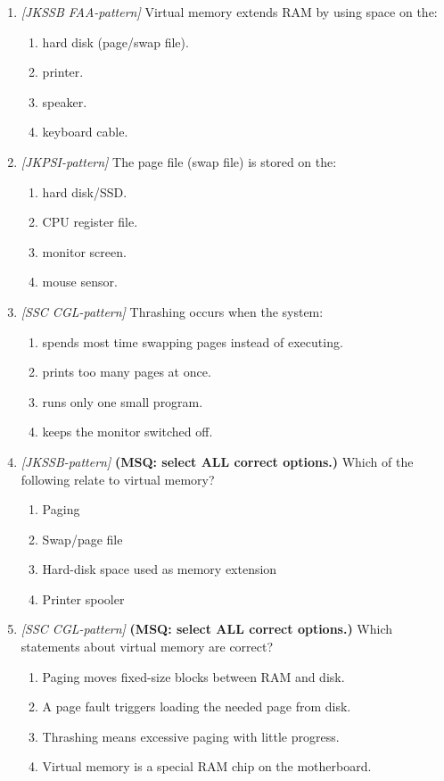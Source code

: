 \documentclass[11pt]{article}
\begin{document}
\begin{enumerate}[label=\textbf{Q\arabic*.}, leftmargin=*]
\item \textit{[JKSSB FAA-pattern]} Virtual memory extends RAM by using space on the:
  \begin{enumerate}[label=\Alph*.]
    \item hard disk (page/swap file).
    \item printer.
    \item speaker.
    \item keyboard cable.
  \end{enumerate}
\item \textit{[JKPSI-pattern]} The page file (swap file) is stored on the:
  \begin{enumerate}[label=\Alph*.]
    \item hard disk/SSD.
    \item CPU register file.
    \item monitor screen.
    \item mouse sensor.
  \end{enumerate}
\item \textit{[SSC CGL-pattern]} Thrashing occurs when the system:
  \begin{enumerate}[label=\Alph*.]
    \item spends most time swapping pages instead of executing.
    \item prints too many pages at once.
    \item runs only one small program.
    \item keeps the monitor switched off.
  \end{enumerate}
\item \textit{[JKSSB-pattern]} \textbf{(MSQ: select ALL correct options.)} Which of the following relate to virtual memory?
  \begin{enumerate}[label=\Alph*.]
    \item Paging
    \item Swap/page file
    \item Hard-disk space used as memory extension
    \item Printer spooler
  \end{enumerate}
\item \textit{[SSC CGL-pattern]} \textbf{(MSQ: select ALL correct options.)} Which statements about virtual memory are correct?
  \begin{enumerate}[label=\Alph*.]
    \item Paging moves fixed-size blocks between RAM and disk.
    \item A page fault triggers loading the needed page from disk.
    \item Thrashing means excessive paging with little progress.
    \item Virtual memory is a special RAM chip on the motherboard.
  \end{enumerate}
\end{enumerate}
\def\JKSSBLessonID{9}\def\JKSSBAnswers{0}
\end{document}
